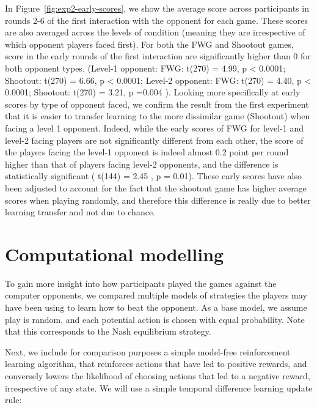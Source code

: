 \documentclass[man,floatsintext]{apa6}
\begin{document}
In Figure~\ref{fig:exp2-early-scores}, we show the average score across participants in rounds 2-6 of the first interaction with the opponent for each game. These scores are also averaged across the levels of condition (meaning they are irrespective of which opponent players faced first). For both the FWG and Shootout games, score in the early rounds of the first interaction are significantly higher than 0 for both opponent types. (Level-1 opponent: FWG: t(270) = 4.99, p \textless{} 0.0001; Shootout: t(270) = 6.66, p \textless{} 0.0001; Level-2 opponent: FWG: t(270) = 4.40, p \textless{} 0.0001; Shootout: t(270) = 3.21, p =0.004 ). Looking more specifically at early scores by type of opponent faced, we confirm the result from the first experiment that it is easier to transfer learning to the more dissimilar game (Shootout) when facing a level 1 opponent. Indeed, while the early scores of FWG for level-1 and level-2 facing players are not significantly different from each other, the score of the players facing the level-1 opponent is indeed almost 0.2 point per round higher than that of players facing level-2 opponents, and the difference is statistically significant ( t(144) = 2.45 , p = 0.01). These early scores have also been adjusted to account for the fact that the shootout game has higher average scores when playing randomly, and therefore this difference is really due to better learning transfer and not due to chance.

\newpage

\hypertarget{computational-modelling}{%
\section{Computational modelling}\label{computational-modelling}}

To gain more insight into how participants played the games against the computer opponents, we compared multiple models of strategies the players may have been using to learn how to beat the opponent. As a base model, we assume play is random, and each potential action is chosen with equal probability. Note that this corresponds to the Nash equilibrium strategy.

Next, we include for comparison purposes a simple model-free reinforcement learning algorithm, that reinforces actions that have led to positive rewards, and conversely lowers the likelihood of choosing actions that led to a negative reward, irrespective of any state. We will use a simple temporal difference learning update rule:
\end{document}
